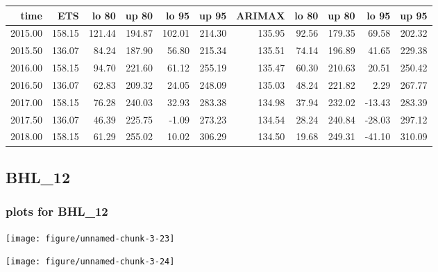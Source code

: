 \documentclass[10pt,a4paper]{article}\usepackage[]{graphicx}\usepackage[]{color}
\makeatletter
\def\maxwidth{ %
  \ifdim\Gin@nat@width>\linewidth
    \linewidth
  \else
    \Gin@nat@width
  \fi
}
\newcommand{\AaA}{\_}
\makeatother
\begin{document}
\begin{table}[ht]
\centering
\begin{tabular}{rrrrrrrrrrr}
  \hline
time & ETS  & lo 80 & up 80 & lo 95 & up 95 & ARIMAX  & lo 80 & up 80 & lo 95 & up 95 \\ 
  \hline
2015.00 & 158.15 & 121.44 & 194.87 & 102.01 & 214.30 & 135.95 & 92.56 & 179.35 & 69.58 & 202.32 \\ 
  2015.50 & 136.07 & 84.24 & 187.90 & 56.80 & 215.34 & 135.51 & 74.14 & 196.89 & 41.65 & 229.38 \\ 
  2016.00 & 158.15 & 94.70 & 221.60 & 61.12 & 255.19 & 135.47 & 60.30 & 210.63 & 20.51 & 250.42 \\ 
  2016.50 & 136.07 & 62.83 & 209.32 & 24.05 & 248.09 & 135.03 & 48.24 & 221.82 & 2.29 & 267.77 \\ 
  2017.00 & 158.15 & 76.28 & 240.03 & 32.93 & 283.38 & 134.98 & 37.94 & 232.02 & -13.43 & 283.39 \\ 
  2017.50 & 136.07 & 46.39 & 225.75 & -1.09 & 273.23 & 134.54 & 28.24 & 240.84 & -28.03 & 297.12 \\ 
  2018.00 & 158.15 & 61.29 & 255.02 & 10.02 & 306.29 & 134.50 & 19.68 & 249.31 & -41.10 & 310.09 \\ 
   \hline
\end{tabular}
\end{table}

\newpage
\subsection{BHL\AaA 12}
\subsubsection{plots for BHL\AaA 12}

\texttt{[image: figure/unnamed-chunk-3-23]} 

\newpage

\texttt{[image: figure/unnamed-chunk-3-24]} 

\newpage
\end{document}

